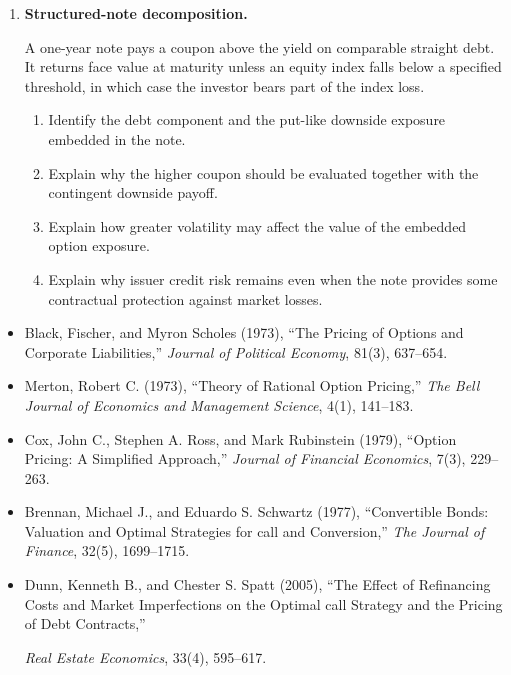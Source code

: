 \begin{enumerate}
\begin{enumerate}
\end{enumerate}

\item \textbf{Structured-note decomposition.}

A one-year note pays a coupon above the yield on comparable straight debt. It returns face value at maturity unless an equity index falls below a specified threshold, in which case the investor bears part of the index loss.

\begin{enumerate}

\item Identify the debt component and the put-like downside exposure embedded in the note.

\item Explain why the higher coupon should be evaluated together with the contingent downside payoff.

\item Explain how greater volatility may affect the value of the embedded option exposure.

\item Explain why issuer credit risk remains even when the note provides some contractual protection against market losses.

\end{enumerate}

\end{enumerate}





\begin{itemize}

\item Black, Fischer, and Myron Scholes (1973),
``The Pricing of Options and Corporate Liabilities,''
\emph{Journal of Political Economy}, 81(3), 637--654.

\item Merton, Robert C. (1973),
``Theory of Rational Option Pricing,''
\emph{The Bell Journal of Economics and Management Science}, 4(1), 141--183.

\item Cox, John C., Stephen A. Ross, and Mark Rubinstein (1979),
``Option Pricing: A Simplified Approach,''
\emph{Journal of Financial Economics}, 7(3), 229--263.

\item Brennan, Michael J., and Eduardo S. Schwartz (1977),
``Convertible Bonds: Valuation and Optimal Strategies for call and Conversion,''
\emph{The Journal of Finance}, 32(5), 1699--1715.

\item Dunn, Kenneth B., and Chester S. Spatt (2005),
``The Effect of Refinancing Costs and Market Imperfections on the Optimal call Strategy and the Pricing of Debt Contracts,''

\emph{Real Estate Economics}, 33(4), 595--617.

\end{itemize}


